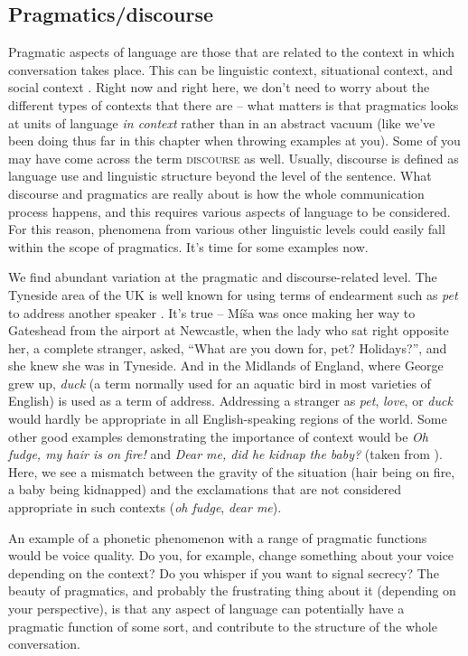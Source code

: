 \subsection{Pragmatics/discourse}\label{pragmatics}
Pragmatic aspects of language are those that are related to the context in which conversation takes place. This can be linguistic context, situational context, and social context \citep{BergmannHallRoss2007}. Right now and right here, we don't need to worry about the different types of contexts that there are -- what matters is that pragmatics looks at units of language \textit{in context} rather than in an abstract vacuum (like we've been doing thus far in this chapter when throwing examples at you). Some of you may have come across the term \textsc{discourse} as well. Usually, discourse is defined as language use and linguistic structure beyond the level of the sentence. What discourse and pragmatics are really about is how the whole communication process happens, and this requires various aspects of language to be considered. For this reason, phenomena from various other linguistic levels could easily fall within the scope of pragmatics. It's time for some examples now.

We find abundant variation at the pragmatic and discourse-related level. The Tyneside area of the UK is well known for using terms of endearment such as \emph{pet} to address another speaker \citep[346]{Beal2000}. It's true -- Míša was once making her way to Gateshead from the airport at Newcastle, when the lady who sat right opposite her, a complete stranger, asked, ``What are you down for, pet? Holidays?'', and she knew she was in Tyneside. And in the Midlands of England, where George grew up, \emph{duck} (a term normally used for an aquatic bird in most varieties of English) is used as a term of address. Addressing a stranger as \emph{pet}, \emph{love}, or \emph{duck} would hardly be appropriate in all English-speaking regions of the world. Some other good examples demonstrating the importance of context would be \textit{Oh fudge, my hair is on fire!} and \textit{Dear me, did he kidnap the baby?} (taken from \citealp[50]{Lakoff1973}). Here, we see a mismatch between the gravity of the situation (hair being on fire, a baby being kidnapped) and the exclamations that are not considered appropriate in such contexts (\textit{oh fudge}, \textit{dear me}).

An example of a phonetic phenomenon with a range of pragmatic functions would be voice quality. Do you, for example, change something about your voice depending on the context? Do you whisper if you want to signal secrecy? The beauty of pragmatics, and probably the frustrating thing about it (depending on your perspective), is that any aspect of language can potentially have a pragmatic function of some sort, and contribute to the structure of the whole conversation.

